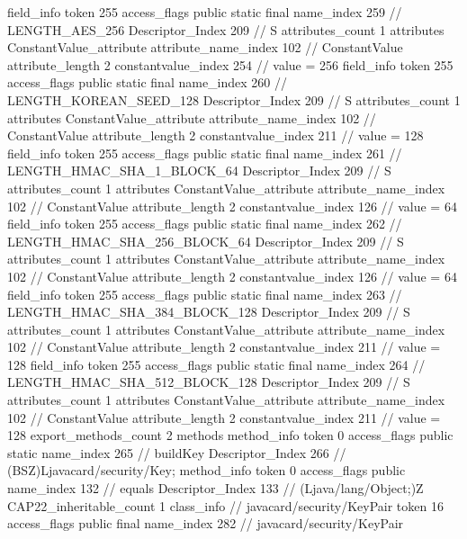 {{{{{{{				}
				}
			}
			field_info {
				token	255
				access_flags	public static final
				name_index	259		// LENGTH_AES_256
				Descriptor_Index	209		// S
				attributes_count	1
				attributes {
				ConstantValue_attribute {
					attribute_name_index	102		// ConstantValue
					attribute_length	2
					constantvalue_index	254		// value = 256
				}
				}
			}
			field_info {
				token	255
				access_flags	public static final
				name_index	260		// LENGTH_KOREAN_SEED_128
				Descriptor_Index	209		// S
				attributes_count	1
				attributes {
				ConstantValue_attribute {
					attribute_name_index	102		// ConstantValue
					attribute_length	2
					constantvalue_index	211		// value = 128
				}
				}
			}
			field_info {
				token	255
				access_flags	public static final
				name_index	261		// LENGTH_HMAC_SHA_1_BLOCK_64
				Descriptor_Index	209		// S
				attributes_count	1
				attributes {
				ConstantValue_attribute {
					attribute_name_index	102		// ConstantValue
					attribute_length	2
					constantvalue_index	126		// value = 64
				}
				}
			}
			field_info {
				token	255
				access_flags	public static final
				name_index	262		// LENGTH_HMAC_SHA_256_BLOCK_64
				Descriptor_Index	209		// S
				attributes_count	1
				attributes {
				ConstantValue_attribute {
					attribute_name_index	102		// ConstantValue
					attribute_length	2
					constantvalue_index	126		// value = 64
				}
				}
			}
			field_info {
				token	255
				access_flags	public static final
				name_index	263		// LENGTH_HMAC_SHA_384_BLOCK_128
				Descriptor_Index	209		// S
				attributes_count	1
				attributes {
				ConstantValue_attribute {
					attribute_name_index	102		// ConstantValue
					attribute_length	2
					constantvalue_index	211		// value = 128
				}
				}
			}
			field_info {
				token	255
				access_flags	public static final
				name_index	264		// LENGTH_HMAC_SHA_512_BLOCK_128
				Descriptor_Index	209		// S
				attributes_count	1
				attributes {
				ConstantValue_attribute {
					attribute_name_index	102		// ConstantValue
					attribute_length	2
					constantvalue_index	211		// value = 128
				}
				}
			}
			}
			export_methods_count	2
			methods {
				method_info {
					token	0
					access_flags	public static
					name_index	265		// buildKey
					Descriptor_Index	266		// (BSZ)Ljavacard/security/Key;
				}
				method_info {
					token	0
					access_flags	public
					name_index	132		// equals
					Descriptor_Index	133		// (Ljava/lang/Object;)Z
				}
			}
			CAP22_inheritable_count	1
		}
		class_info {		// javacard/security/KeyPair
			token	16
			access_flags	public final
			name_index	282		// javacard/security/KeyPair
}}}
